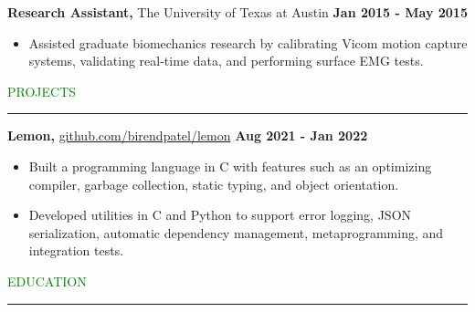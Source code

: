 \documentclass [
        11pt
] {article}
\begin{document}
\noindent \textbf{Research Assistant,} The University of Texas at Austin
\hspace*{\fill} \textbf{Jan 2015 - May 2015}

\begin{itemize}[itemsep=1pt,topsep=1pt]
\renewcommand{\labelitemi}{\scriptsize$\blacksquare$}

\item Assisted graduate biomechanics research by calibrating Vicom motion 
capture systems, validating real-time data, and performing surface EMG tests.

\end{itemize}

\vspace*{10pt}


\noindent\textcolor{green}{PROJECTS \rule{16.3cm}{1pt}}

\vspace*{10pt}

\noindent \textbf {Lemon,} \href{https://github.com/birendpatel/lemon}{github.com/birendpatel/lemon}
\hspace*{\fill} \textbf{Aug 2021 - Jan 2022}

\begin{itemize}[noitemsep,topsep=0pt]
\renewcommand{\labelitemi}{\scriptsize$\blacksquare$}

\item Built a programming language in C with features such as an optimizing
compiler, garbage collection, static typing, and object orientation.

\vspace*{5pt}

\item Developed utilities in C and Python to support error logging, JSON serialization,
automatic dependency management, metaprogramming, and integration tests.

\end{itemize}

\vspace*{10pt}


\noindent\textcolor{green}{EDUCATION \rule{16cm}{1pt}}
\end{document}
